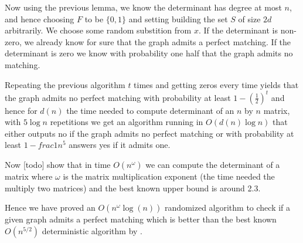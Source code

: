 	Now using the previous lemma, we know the determinant has degree at most $n$, and hence choosing $F$ to be $\{0, 1\}$ and setting building the set $S$ of size $2d$ arbitrarily. We choose some random substition from $x$. If the determinant is non-zero, we already know for sure that the graph admits a perfect matching. If the determinant is zero we know with probability one half that the graph admits no matching.

	Repeating the previous algorithm $t$ times and getting zeros every time yields that the graph admits no perfect matching with probability at least $1 - (\frac{1}{2})^t$ and hence for $d(n)$ the time needed to compute determinant of an $n$ by $n$ matrix, with $5 \log n$ repetitions we get an algorithm running in $O(d(n) \log n)$ that either outputs no if the graph admits no perfect matching or with probability at least $1 - frac{1}{n^5}$ answers yes if it admits one.

	Now [todo] show that in time $O(n^\omega)$ we can compute the determinant of a matrix where $\omega$ is the matrix multiplication exponent (the time needed the multiply two matrices) and the best known upper bound is around 2.3.

	Hence we have proved an $O(n^{\omega} \log(n))$ randomized algorithm to check if a given graph admits a perfect matching which is better than the best known $O(n^{5/2})$ deterministic algorithm by \citet{micali1980v}.
